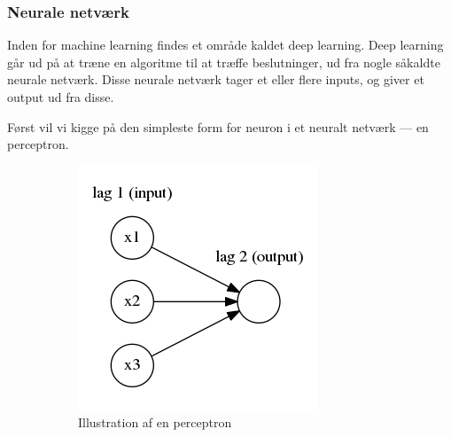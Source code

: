 \subsubsection{Neurale netværk}
Inden for machine learning findes et område kaldet deep learning. Deep learning går ud på at træne en algoritme til at træffe beslutninger, ud fra nogle såkaldte neurale netværk. Disse neurale netværk tager et eller flere inputs, og giver et output ud fra disse. 

Først vil vi kigge på den simpleste form for neuron i et neuralt netværk --- en perceptron\cite{neural}.
\FloatBarrier
\begin{figure}[h!]
    \centering
    \begin{subfigure}[b]{0.4\textwidth}
        \includegraphics[width=\textwidth]{images/neural1.png}
		\caption{Illustration af en perceptron}
		\label{fig:perceptron}
    \end{subfigure}
    ~ %
    \begin{subfigure}[b]{0.4\textwidth}

\end{subfigure}
\end{figure}
